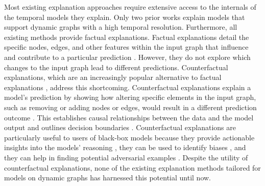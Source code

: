 Most existing explanation approaches require extensive access to the internals of the temporal models they explain. Only two prior works explain models that support dynamic graphs with a high temporal resolution. Furthermore, all existing methods provide factual explanations. Factual explanations detail the specific nodes, edges, and other features within the input graph that influence and contribute to a particular prediction \cite{tan_learning_2022}. However, they do not explore which changes to the input graph lead to different predictions. Counterfactual explanations, which are an increasingly popular alternative to factual explanations \cite{prado-romero_survey_2023}, address this shortcoming. Counterfactual explanations explain a model's prediction by showing how altering specific elements in the input graph, such as removing or adding nodes or edges, would result in a different prediction outcome \cite{byrne_counterfactuals_2019}. This establishes causal relationships between the data and the model output and outlines decision boundaries \cite{prado-romero_survey_2023}.
Counterfactual explanations are particularly useful to users of black-box models because they provide actionable insights into the models' reasoning \cite{lucic_cf-gnnexplainer_2022}, they can be used to identify biases \cite{prado-romero_survey_2023}, and they can help in finding potential adversarial examples \cite{lucic_cf-gnnexplainer_2022}. Despite the utility of counterfactual explanations, none of the existing explanation methods tailored for models on dynamic graphs has harnessed this potential until now.

